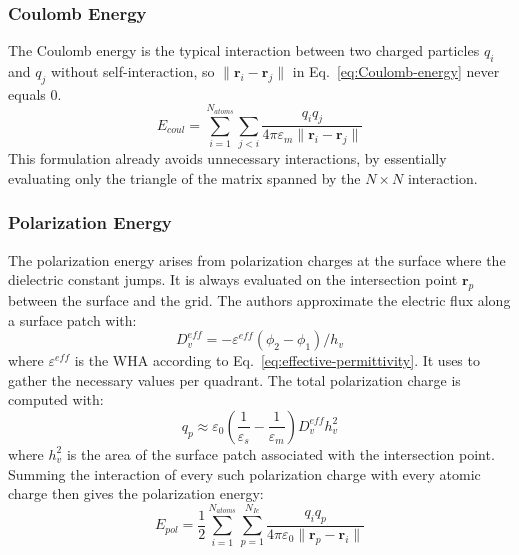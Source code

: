 \subsubsection{Coulomb Energy}

The Coulomb energy is the typical interaction between two charged particles $q_i$ and $q_j$ without self-interaction, so $\lVert \mathbf{r}_i - \mathbf{r}_j \rVert$ in Eq.~\eqref{eq:Coulomb-energy} never equals 0. 
\begin{equation}
    E_{coul} = \sum_{i=1}^{N_{atoms}} \sum_{j<i} \frac{q_i q_j}{4\pi\varepsilon_m \lVert \mathbf{r}_i - \mathbf{r}_j \rVert}
    \label{eq:Coulomb-energy}
\end{equation}
This formulation already avoids unnecessary interactions, by essentially evaluating only the triangle of the matrix spanned by the $N \times N$ interaction.

\subsubsection{Polarization Energy}

The polarization energy arises from polarization charges at the surface where the dielectric constant jumps. It is always evaluated on the intersection point $\mathbf{r}_p$ between the surface and the grid.
The authors approximate the electric flux along a surface patch with:
\begin{equation}
    D_v^{eff} = - \varepsilon^{eff}(\phi_2 - \phi_1)/h_v
    \label{eq:electric-flux}
\end{equation}
where $\varepsilon^{eff}$ is the WHA according to Eq.~\eqref{eq:effective-permittivity}.
It uses  to gather the necessary values per quadrant.
The total polarization charge is computed with:
\begin{equation}
    q_p \approx \varepsilon_0 \left( \frac{1}{\varepsilon_s} - \frac{1}{\varepsilon_m} \right) D_v^{eff} h_v^2
    \label{eq:polarization-charge}
\end{equation}
where $h_v^2$ is the area of the surface patch associated with the intersection point.
Summing the interaction of every such polarization charge with every atomic charge then gives the polarization energy:
\begin{equation}
    E_{pol} = \frac{1}{2} \sum_{i=1}^{N_{atoms}} \sum_{p=1}^{N_{Ic}} \frac{q_i q_p}{4\pi\varepsilon_0 \lVert \mathbf{r}_p - \mathbf{r}_i \rVert}
    \label{eq:polarization-energy}
\end{equation}

